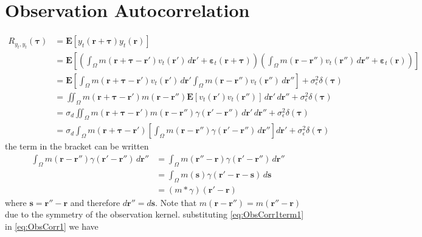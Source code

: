 \documentclass[]{article}
\begin{document}
\section*{Observation Autocorrelation}\label{sec:ObservAutocor} 
\begin{align}
	R_{y_{t},y_{t}}(\boldsymbol{\tau}) &= \mathbf{E}\left[y_{t}\left(\mathbf{r}+\boldsymbol{\tau}\right)y_{t}\left(\mathbf{r}\right)\right] \nonumber\\
	&= \mathbf{E}\left[\left(\int_{\Omega}{ m\left(\mathbf{r} + \boldsymbol{\tau} - \mathbf{r}'\right) v_t\left(\mathbf{r}'\right)\, d\mathbf{r}'} + \boldsymbol{\varepsilon}_t\left(\mathbf{r}+\boldsymbol{\tau}\right)\right) \left(\int_{\Omega}{ m\left(\mathbf{r} - \mathbf{r}''\right) v_{t}\left(\mathbf{r}''\right) \, d\mathbf{r}''} + \boldsymbol{\varepsilon}_{t}\left(\mathbf{r}\right)\right) \right]\nonumber \\
	&=\mathbf{E}\left[\int_{\Omega}{ m\left(\mathbf{r} + \boldsymbol{\tau} - \mathbf{r}'\right) v_t\left(\mathbf{r}'\right)\, d\mathbf{r}'} \int_{\Omega}{ m\left(\mathbf{r} - \mathbf{r}''\right) v_{t}\left(\mathbf{r}''\right) \, d\mathbf{r}''}\right]+\sigma_{\epsilon}^2\delta(\boldsymbol\tau)\nonumber\\
	&=\iint_{\Omega}{ m\left(\mathbf{r} + \boldsymbol{\tau} - \mathbf{r}'\right) m\left(\mathbf{r} - \mathbf{r}''\right) \mathbf{E}\left[v_t\left(\mathbf{r}'\right) v_{t}\left(\mathbf{r}''\right)\right]\, d\mathbf{r}'}{ \, d\mathbf{r}''}+\sigma_{\epsilon}^2\delta(\boldsymbol\tau) \nonumber\\
	&=\sigma_d\iint_{\Omega}{ m\left(\mathbf{r} + \boldsymbol{\tau} - \mathbf{r}'\right) m\left(\mathbf{r} - \mathbf{r}''\right)\gamma(\mathbf{r}'-\mathbf{r}'') \, d\mathbf{r}'}{ \, d\mathbf{r}''}+\sigma_{\epsilon}^2\delta(\boldsymbol\tau)\nonumber \\
	&=\sigma_d\int_{\Omega} m\left(\mathbf r  + \boldsymbol\tau - \mathbf r'\right) \left[\int_{\Omega} m\left(\mathbf r - \mathbf r''\right)\gamma(\mathbf r'-\mathbf r'') \, d\mathbf r'' \right]  d\mathbf r'+\sigma_{\epsilon}^2\delta(\boldsymbol\tau)\label{eq:ObsCorr1}
\end{align}
the term in the bracket can be written
\begin{align}
 \int_{\Omega} m\left(\mathbf r - \mathbf r''\right)\gamma(\mathbf r'-\mathbf r'') \, d\mathbf r''&=\int_{\Omega} m\left(\mathbf r'' - \mathbf r\right)\gamma(\mathbf r'-\mathbf r'') \, d\mathbf r'' \nonumber \\
&=\int_{\Omega} m\left(\mathbf s\right)\gamma(\mathbf r'-\mathbf r-\mathbf s) \, d\mathbf s\nonumber \\
&=\left(m\ast\gamma\right)(\mathbf r'-\mathbf r)\label{eq:ObsCorr1term1}
\end{align}
where $\mathbf s=\mathbf r''-\mathbf r$ and therefore $d\mathbf r''=d\mathbf s$. Note that  $m\left(\mathbf{r}-\mathbf{r''}\right)=m\left(\mathbf{r''}-\mathbf{r}\right)$ due to the  symmetry of the observation kernel.
substituting \eqref{eq:ObsCorr1term1} in \eqref{eq:ObsCorr1} we have
\end{document}
